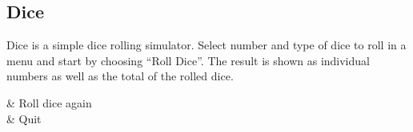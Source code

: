 \subsection{Dice}
Dice is a simple dice rolling simulator. Select number and type of dice to roll
in a menu and start by choosing ``Roll Dice''. The result is shown as individual
numbers as well as the total of the rolled dice.

\begin{btnmap}
    \PluginSelect
        & Roll dice again\\

    \PluginCancel
        & Quit\\
\end{btnmap}

